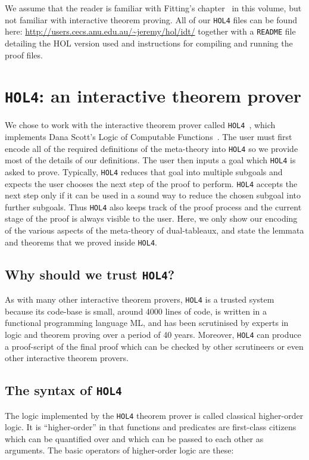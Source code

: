 \documentclass[a4paper]{article}
\newcommand{\hol}{\texttt{HOL4}}
\begin{document}
We assume that the reader is familiar with Fitting's
chapter~\cite{fitting-dual-tableau} in this volume, but not familiar
with interactive theorem proving. All of our \hol{} files can be found
here:
\url{http://users.cecs.anu.edu.au/~jeremy/hol/idt/}
together with a \texttt{README} file detailing the HOL version used
and instructions for compiling and running the proof files.

\section{\hol: an interactive theorem prover}

We chose to work with the interactive theorem prover called
\hol~\cite{DBLP:conf/tphol/Gordon08}, which implements Dana Scott's
Logic of Computable Functions~\cite{scott-computable}. The user must
first encode all of the required definitions of the meta-theory into
\hol{} so we provide most of the details of our definitions. The user
then inputs a goal which \hol{} is asked to prove. Typically, \hol{}
reduces that goal into multiple subgoals and expects the user chooses
the next step of the proof to perform. \hol{} accepts the next step
only if it can be used in a sound way to reduce the chosen subgoal
into further subgoals. Thus \hol{} also keeps track of the proof
process and the current stage of the proof is always visible to the
user. Here, we only show our encoding of the various aspects of the
meta-theory of dual-tableaux, and state the lemmata and theorems that
we proved inside \hol.

\subsection{Why should we trust \hol?}

As with many other interactive theorem provers, \hol{} is a trusted
system because its code-base is small, around 4000 lines of
code, is written in a functional programming language ML, and has
been scrutinised by experts in logic and theorem proving over a period
of 40 years. Moreover, \hol{} can produce a proof-script of the final
proof which can be checked by other scrutineers or even other
interactive theorem provers.

\subsection{The syntax of \hol}

The logic implemented by the \hol{} theorem prover is called
classical higher-order logic. It is ``higher-order'' in that functions and
predicates are first-class citizens which can be quantified over and
which can be passed to each other as arguments. The basic operators of
higher-order logic are
these:
\end{document}

